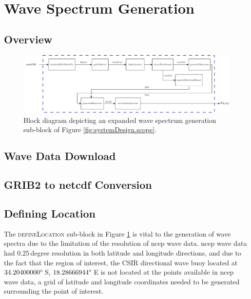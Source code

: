 \section{Wave Spectrum Generation} \label{sec:systemDesign.waveSpectrum}



\subsection{Overview} \label{subsec:systemDesign.waveSpectrum.Overview}

\begin{figure}[H]
    \centering
    \includegraphics[width=.95\linewidth]{Figures/PipelineDesign/wave_spectrum.pdf}
    \caption{Block diagram depicting an expanded wave spectrum generation sub-block of Figure \ref{fig:systemDesign.scope}.}
    \label{fig:systemDesign.wavesSpectrum.blockDiagram}
\end{figure}

\subsection{Wave Data Download} \label{subsec:systemDesign.waveSpectrum.download}

\subsection{GRIB2 to \acs{netcdf} Conversion} \label{subsec:systemDesign.waveSpectrum.toNetCDF}

\subsection{Defining Location} \label{subsec:systemDesign.defineLocation}

The \textsc{defineLocation} sub-block in Figure \ref{fig:systemDesign.wavesSpectrum.blockDiagram} is vital to the generation of wave spectra due to the limitation of the resolution of \acs{ncep} wave data. \acs{ncep} wave data had 0.25\,degree resolution in both latitude and longitude directions, and due to the fact that the region of interest, the CSIR directional wave buoy located at $34.20400000\degree$\,S, $18.28666944\degree$\,E is not located at the points available in \acs{ncep} wave data, a grid of latitude and longitude coordinates needed to be generated surrounding the point of interest. 

